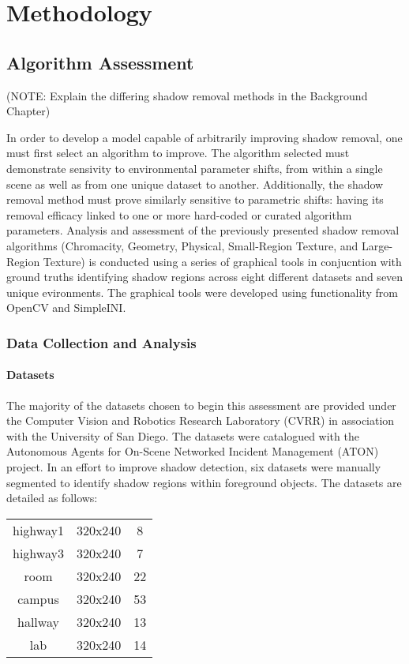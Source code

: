 \documentclass[12pt]{report}
\begin{document}
\doublespacing

\clearpage
\chapter{Methodology}

\section{Algorithm Assessment}

(NOTE: Explain the differing shadow removal methods in the Background Chapter)

In order to develop a model capable of arbitrarily improving shadow removal, one must first select an algorithm to improve. The algorithm selected must demonstrate sensivity to environmental parameter shifts, from within a single scene as well as from one unique dataset to another. Additionally, the shadow removal method must prove similarly sensitive to parametric shifts: having its removal efficacy linked to one or more hard-coded or curated algorithm parameters. Analysis and assessment of the previously presented shadow removal algorithms (Chromacity, Geometry, Physical, Small-Region Texture, and Large-Region Texture) is conducted using a series of graphical tools in conjucntion with ground truths identifying shadow regions across eight different datasets and seven unique evironments. The graphical tools were developed using functionality from OpenCV and SimpleINI.

\subsection{Data Collection and Analysis}

\subsubsection{Datasets}
The majority of the datasets chosen to begin this assessment are provided under the Computer Vision and Robotics Research Laboratory (CVRR) in association with the University of San Diego. The datasets were catalogued with the Autonomous Agents for On-Scene Networked Incident Management (ATON) project. In an effort to improve shadow detection, six datasets were manually segmented to identify shadow regions within foreground objects. The datasets are detailed as follows:

\begin{center}
\begin{tabular}{ |c|c|c| }
	\hline
	highway1 & 320x240 & 8 \\ 
	highway3 & 320x240 & 7 \\ 
	room & 320x240 & 22 \\ 
	campus & 320x240 & 53 \\ 
	hallway & 320x240 & 13 \\ 
	lab & 320x240 & 14 \\ 
	\hline
\end{tabular}
\end{center}
\end{document}
